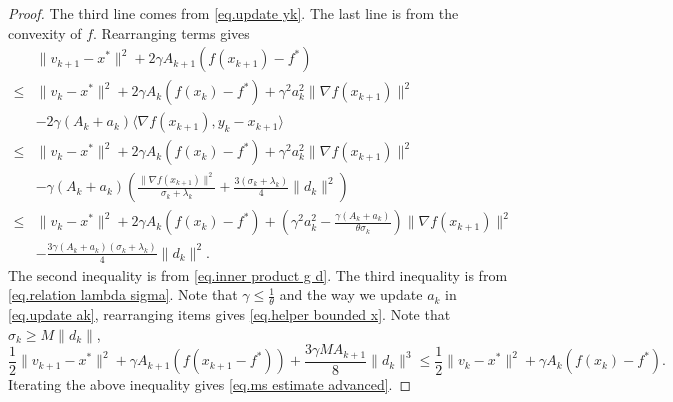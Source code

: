 \documentclass{mcom-l}
\numberwithin{equation}{section}
\begin{document}
\begin{proof}
    The third line comes from \eqref{eq.update yk}. The last line is from the convexity of $f$. Rearranging terms gives
    \begin{align*}
             & \|v_{k+1}-x^*\|^2 +2\gamma A_{k+1} \left (f(x_{k+1})-f^*\right)                                                                                \\
        \leq & \|v_k-x^*\|^2+2\gamma A_k \left (f(x_k)-f^*\right )+\gamma^2 a_k^2 \|\nabla f(x_{k+1})\|^2                                                     \\
             & -2\gamma \left (A_k+a_k\right)\langle \nabla f(x_{k+1}), y_k-x_{k+1} \rangle                                                                   \\
        \leq & \|v_k-x^*\|^2+2\gamma A_k \left (f(x_k)-f^*\right )+\gamma^2 a_k^2 \|\nabla f(x_{k+1})\|^2                                                     \\
             & -\gamma \left (A_k+a_k\right)\left (\frac{\|\nabla f(x_{k+1})\|^2}{\sigma_k+\lambda_k}+\frac{3(\sigma_k+\lambda_k)}{4}\|d_k\|^2\right)         \\
        \leq & \|v_k-x^*\|^2+2\gamma A_k \left (f(x_k)-f^*\right )+\left(\gamma^2 a_k^2-\frac{\gamma(A_k+a_k)}{\theta \sigma_k}\right)\|\nabla f(x_{k+1})\|^2 \\
             & -\frac{3\gamma(A_k+a_k)(\sigma_k+\lambda_k)}{4}\|d_k\|^2.
    \end{align*}
    The second inequality is from \eqref{eq.inner product g d}. The third inequality is from \eqref{eq.relation lambda sigma}. Note that $\gamma \leq \frac{1}{\theta}$ and the way we update $a_k$ in \eqref{eq.update ak}, rearranging items gives \eqref{eq.helper bounded x}.
    Note that $\sigma_k \geq M\|d_k\|$,
    \begin{equation*}
        \frac{1}{2}\|v_{k+1}-x^* \|^2 +\gamma A_{k+1}\left (f(x_{k+1}-f^*)\right)+ \frac{3\gamma M A_{k+1}}{8}\|d_k\|^3 \leq \frac{1}{2}\|v_k-x^*\|^2 +\gamma A_k \left (f(x_k)-f^*\right).
    \end{equation*}
    Iterating the above inequality gives \eqref{eq.ms estimate advanced}.
\end{proof}
\end{document}
